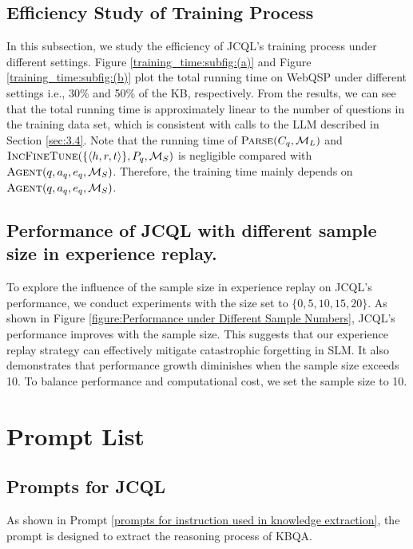 \subsection{Efficiency Study of Training Process}
In this subsection, we study the efficiency of JCQL's training process under different settings. Figure \ref{training_time:subfig:(a)} and Figure \ref{training_time:subfig:(b)} plot the total running time on WebQSP under different settings i.e., 30\% and 50\% of the KB, respectively. From the results, we can see that the total running time is approximately linear to the number of questions in the training data set, which is consistent with calls to the LLM described in Section \ref{sec:3.4}. Note that the running time of $\textsc{Parse}(C_q,\mathcal{M}_L)$ and $\textsc{IncFineTune}(\{\langle h,r,t\rangle\},P_q,\mathcal{M}_S)$ is negligible compared with $\textsc{Agent}(q,a_q,e_q,\mathcal{M}_S)$. Therefore, the training time mainly depends on $\textsc{Agent}(q,a_q,e_q,\mathcal{M}_S)$.

\subsection{Performance of JCQL with different sample size in experience replay.} To explore the influence of the sample size in experience replay on JCQL’s performance, we conduct experiments with the size set to $\{0, 5, 10, 15, 20\}$. As shown in Figure \ref{figure:Performance under Different Sample Numbers}, JCQL’s performance improves with the sample size. 
This suggests that our experience replay strategy can effectively mitigate catastrophic forgetting in SLM. It also demonstrates that performance growth diminishes when the sample size exceeds 10. To balance performance and computational cost, we set the sample size to 10.



\section{Prompt List} \label{appendix:prompt}

\subsection{Prompts for JCQL}\label{appendix:prompt:framework}
As shown in Prompt \ref{prompts for instruction used in knowledge extraction}, the prompt is designed to extract the reasoning process of KBQA. 

% 

